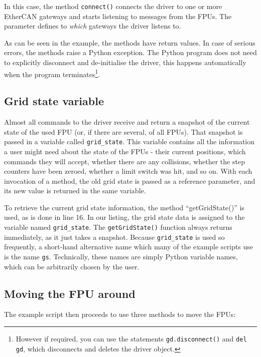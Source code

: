 \documentclass{scrartcl}[12pt,a4paper]
\begin{document}
In this case, the method \texttt{connect()} connects the driver to one
or more EtherCAN gateways and starts listening to messages from the
FPUs. The parameter defines to \emph{which} gateways the driver
listens to.

As can be seen in the example, the methods have return values.  In
case of serious errors, the methods raise a Python exception. The
Python program does not need to explicitly disconnect and
de-initialise the driver, this happens automatically when the program
terminates\footnote{However if required, you can use the statements
  \texttt{gd.disconnect()} and \texttt{del gd}, which disconnects and
  deletes the driver object.}.



\subsection{Grid state variable}

Almost all commands to the driver receive and return a snapshot of the
current state of the used FPU (or, if there are several, of all
FPUs). That snapshot is passed in a variable called
\texttt{grid\_state}. This variable contains all the information a
user might need about the state of the FPUs - their current positions,
which commands they will accept, whether there are any collisions,
whether the step counters have been zeroed, whether a limit switch was
hit, and so on. With each invocation of a method, the old grid state
is passed as a reference parameter, and its new value is returned in
the same variable.

To retrieve the current grid state information, the method
``getGridState()'' is used, as is done in line 16. In our listing, the
grid state data is assigned to the variable named
\texttt{grid\_state}.  The \texttt{getGridState()} function always
returns immediately, as it just takes a snapshot. Because
\texttt{grid\_state} is used so frequently, a short-hand alternative
name which many of the example scripts use is the name \texttt{gs}.
Technically, these names are simply Python variable names, which can
be arbitrarily chosen by the user.

\subsection{Moving the FPU around}

The example script then proceeds to use three methods to move
the FPUs:
\end{document}
